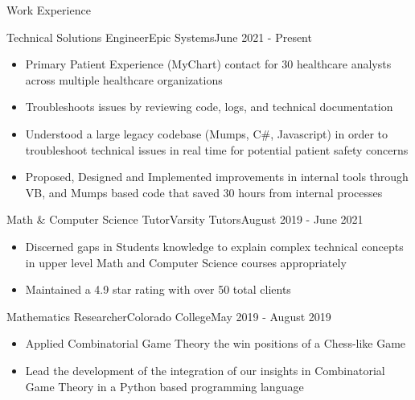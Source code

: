 \begin{cvsection}{Work Experience}
	\begin{cvsubsection}{Technical Solutions Engineer}{Epic Systems}{June 2021 - Present}			
		\begin{itemize}
			\item Primary Patient Experience (MyChart) contact for 30 healthcare analysts across multiple healthcare organizations
			\item Troubleshoots issues by reviewing code, logs, and technical documentation
			\item Understood a large legacy codebase (Mumps, C\#, Javascript) in order to troubleshoot technical issues in real time for potential patient safety concerns
			\item Proposed, Designed and Implemented improvements in internal tools through VB, and Mumps based code that saved 30 hours from internal processes
		\end{itemize}
	\end{cvsubsection}
	
	\begin{cvsubsection}{Math \& Computer Science Tutor}{Varsity Tutors}{August 2019 - June 2021}	
		\begin{itemize}
			\item Discerned gaps in Students knowledge to explain complex technical concepts in upper level Math and Computer Science courses appropriately
			\item Maintained a 4.9 star rating with over 50 total clients
		\end{itemize}
	\end{cvsubsection}
	
	\begin{cvsubsection}{Mathematics Researcher}{Colorado College}{May 2019 - August 2019}
	\begin{itemize}
		\item Applied Combinatorial Game Theory the win positions of a Chess-like Game
		\item Lead the development of the integration of our insights in Combinatorial Game Theory in a Python based programming language
		\end{itemize}
	\end{cvsubsection}
\end{cvsection}



